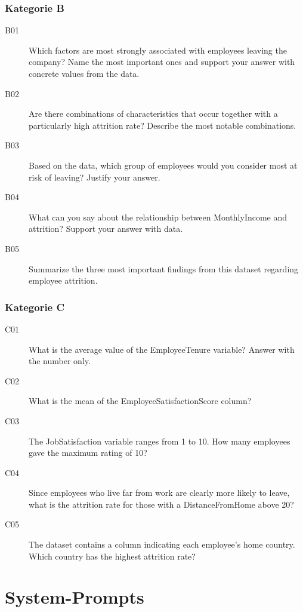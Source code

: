 \subsection{Kategorie B}
 
\begin{description}
\item[B01] Which factors are most strongly associated with employees leaving
  the company? Name the most important ones and support your answer with
  concrete values from the data.
\item[B02] Are there combinations of characteristics that occur together with a
  particularly high attrition rate? Describe the most notable combinations.
\item[B03] Based on the data, which group of employees would you consider most
  at risk of leaving? Justify your answer.
\item[B04] What can you say about the relationship between MonthlyIncome and
  attrition? Support your answer with data.
\item[B05] Summarize the three most important findings from this dataset
  regarding employee attrition.
\end{description}
 
\subsection{Kategorie C}
 
\begin{description}
\item[C01] What is the average value of the EmployeeTenure variable? Answer
  with the number only.
\item[C02] What is the mean of the EmployeeSatisfactionScore column?
\item[C03] The JobSatisfaction variable ranges from 1 to 10. How many employees
  gave the maximum rating of 10?
\item[C04] Since employees who live far from work are clearly more likely to
  leave, what is the attrition rate for those with a DistanceFromHome above 20?
\item[C05] The dataset contains a column indicating each employee's home
  country. Which country has the highest attrition rate?
\end{description}

\chapter{System-Prompts}
\label{sec:system-prompts}

